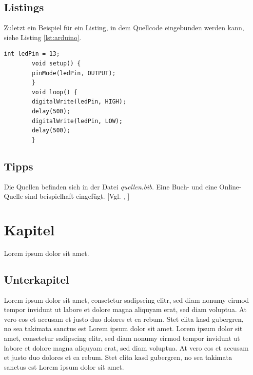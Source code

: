 \documentclass[12pt,a4paper,bibliography=totocnumbered,listof=totocnumbered]{scrartcl}
\begin{document}
    \subsection{Listings}
    Zuletzt ein Beispiel für ein Listing, in dem Quellcode eingebunden werden kann, siehe Listing \ref{lst:arduino}.

    \vspace{1em}
    \begin{lstlisting}[caption=Arduino Beispielprogramm, label=lst:arduino]
        int ledPin = 13;
        void setup() {
        pinMode(ledPin, OUTPUT);
        }
        void loop() {
        digitalWrite(ledPin, HIGH);
        delay(500);
        digitalWrite(ledPin, LOW);
        delay(500);
        }
    \end{lstlisting}

    \subsection{Tipps}
    Die Quellen befinden sich in der Datei \textit{quellen.bib}. Eine Buch- und eine Online-Quelle sind beispielhaft eingefügt. [Vgl. \cite{buch}, \cite{online}]

    \pagebreak

    \section{Kapitel}
    Lorem ipsum dolor sit amet.

    \subsection{Unterkapitel}
    Lorem ipsum dolor sit amet, consetetur sadipscing elitr, sed diam nonumy eirmod tempor invidunt ut labore et dolore magna aliquyam erat, sed diam voluptua. At vero eos et accusam et justo duo dolores et ea rebum. Stet clita kasd gubergren, no sea takimata sanctus est Lorem ipsum dolor sit amet. Lorem ipsum dolor sit amet, consetetur sadipscing elitr, sed diam nonumy eirmod tempor invidunt ut labore et dolore magna aliquyam erat, sed diam voluptua. At vero eos et accusam et justo duo dolores et ea rebum. Stet clita kasd gubergren, no sea takimata sanctus est Lorem ipsum dolor sit amet.
\end{document}
